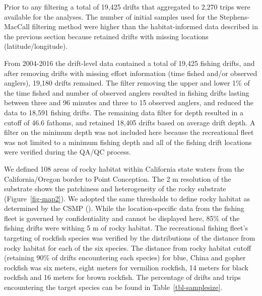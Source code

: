 \documentclass[
  12pt,
  authoryear,
  preprint,
  3p]{elsarticle}
\begin{document}
Prior to any filtering a total of 19,425 drifts that aggregated to 2,270
trips were available for the analyses. The number of initial samples
used for the Stephens-MacCall filtering method were higher than the
habitat-informed data described in the previous section because retained
drifts with missing locations (latitude/longitude).

From 2004-2016 the drift-level data contained a total of 19,425 fishing
drifts, and after removing drifts with missing effort information (time
fished and/or observed anglers), 19,180 drifts remained. The filter
removing the upper and lower 1\% of the time fished and number of
observed anglers resulted in fishing drifts lasting between three and 96
minutes and three to 15 observed anglers, and reduced the data to 18,591
fishing drifts. The remaining data filter for depth resulted in a cutoff
of 46.6 fathoms, and retained 18,405 drifts based on average drift
depth. A filter on the minimum depth was not included here because the
recreational fleet was not limited to a minimum fishing depth and all of
the fishing drift locations were verified during the QA/QC process.

We defined 108 areas of rocky habitat within California state waters
from the California/Oregon border to Point Conception. The 2 m
resolution of the substrate shows the patchiness and heterogeneity of
the rocky substrate (Figure~\ref{fig-map2}). We adopted the same
thresholds to define rocky habitat as determined by the CSMP
(\citet{CSUMB:2014:CSM}). While the location-specific data from the
fishing fleet is governed by confidentiality and cannot be displayed
here, 85\% of the fishing drifts were withing 5 m of rocky habitat. The
recreational fishing fleet's targeting of rockfish species was verified
by the distributions of the distance from rocky habitat for each of the
six species. The distance from rocky habitat cutoff (retaining 90\% of
drifts encountering each species) for blue, China and gopher rockfish
was six meters, eight meters for vermilion rockfish, 14 meters for black
rockfish and 16 meters for brown rockfish. The percentage of drifts and
trips encountering the target species can be found in
Table~\ref{tbl-samplesize}.
\end{document}
